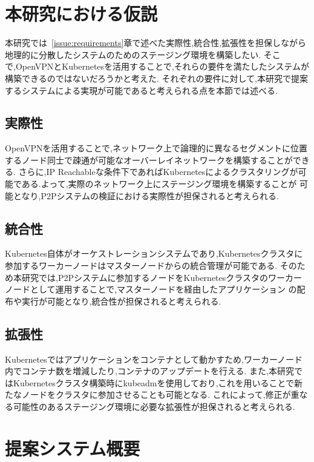 \section{本研究における仮説}
\label{issue:hypothesis}

本研究では~\ref{issue:requirements}章で述べた実際性,統合性,拡張性を担保しながら地理的に分散したシステムのためのステージング環境を構築したい.
そこで,OpenVPNとKubernetesを活用することで,それらの要件を満たしたシステムが構築できるのではないだろうかと考えた.
それぞれの要件に対して,本研究で提案するシステムによる実現が可能であると考えられる点を本節では述べる.

\subsection{実際性}

OpenVPNを活用することで,ネットワーク上で論理的に異なるセグメントに位置するノード同士で疎通が可能なオーバーレイネットワークを構築することができる.
さらに,IP Reachableな条件下であればKubernetesによるクラスタリングが可能である.よって,実際のネットワーク上にステージング環境を構築することが
可能となり,P2Pシステムの検証における実際性が担保されると考えられる.

\subsection{統合性}

Kubernetes自体がオーケストレーションシステムであり,Kubernetesクラスタに参加するワーカーノードはマスターノードからの統合管理が可能である.
そのため本研究では,P2Pシステムに参加するノードをKubernetesクラスタのワーカーノードとして運用することで,マスターノードを経由したアプリケーション
の配布や実行が可能となり,統合性が担保されると考えられる.

\subsection{拡張性}

Kubernetesではアプリケーションをコンテナとして動かすため,ワーカーノード内でコンテナ数を増減したり,コンテナのアップデートを行える.
また,本研究ではKubernetesクラスタ構築時にkubeadmを使用しており,これを用いることで新たなノードをクラスタに参加させることも可能となる.
これによって,修正が重なる可能性のあるステージング環境に必要な拡張性が担保されると考えられる.

\section{提案システム概要}
\label{issue:about-system}

